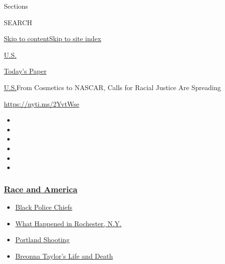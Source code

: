 Sections

SEARCH

\protect\hyperlink{site-content}{Skip to
content}\protect\hyperlink{site-index}{Skip to site index}

\href{https://www.nytimes3xbfgragh.onion/section/us}{U.S.}

\href{https://myaccount.nytimes3xbfgragh.onion/auth/login?response_type=cookie\&client_id=vi}{}

\href{https://www.nytimes3xbfgragh.onion/section/todayspaper}{Today's
Paper}

\href{/section/us}{U.S.}\textbar{}From Cosmetics to NASCAR, Calls for
Racial Justice Are Spreading

\url{https://nyti.ms/2YvtWse}

\begin{itemize}
\item
\item
\item
\item
\item
\item
\end{itemize}

\hypertarget{race-and-america}{%
\subsubsection{\texorpdfstring{\href{https://www.nytimes3xbfgragh.onion/news-event/george-floyd-protests-minneapolis-new-york-los-angeles?name=styln-george-floyd\&region=TOP_BANNER\&block=storyline_menu_recirc\&action=click\&pgtype=Article\&impression_id=00c483a0-f4b8-11ea-be57-b52c479cbc12\&variant=undefined}{Race
and America}}{Race and America}}\label{race-and-america}}

\begin{itemize}
\tightlist
\item
  \href{https://www.nytimes3xbfgragh.onion/2020/09/11/us/black-police-chiefs-reform.html?name=styln-george-floyd\&region=TOP_BANNER\&block=storyline_menu_recirc\&action=click\&pgtype=Article\&impression_id=00c483a1-f4b8-11ea-be57-b52c479cbc12\&variant=undefined}{Black
  Police Chiefs}
\item
  \href{https://www.nytimes3xbfgragh.onion/2020/09/04/nyregion/rochester-police-daniel-prude.html?name=styln-george-floyd\&region=TOP_BANNER\&block=storyline_menu_recirc\&action=click\&pgtype=Article\&impression_id=00c483a2-f4b8-11ea-be57-b52c479cbc12\&variant=undefined}{What
  Happened in Rochester, N.Y.}
\item
  \href{https://www.nytimes3xbfgragh.onion/2020/08/30/us/portland-shooting-explained.html?name=styln-george-floyd\&region=TOP_BANNER\&block=storyline_menu_recirc\&action=click\&pgtype=Article\&impression_id=00c483a3-f4b8-11ea-be57-b52c479cbc12\&variant=undefined}{Portland
  Shooting}
\item
  \href{https://www.nytimes3xbfgragh.onion/2020/08/30/us/breonna-taylor-police-killing.html?name=styln-george-floyd\&region=TOP_BANNER\&block=storyline_menu_recirc\&action=click\&pgtype=Article\&impression_id=00c483a4-f4b8-11ea-be57-b52c479cbc12\&variant=undefined}{Breonna
  Taylor's Life and Death}
\end{itemize}

